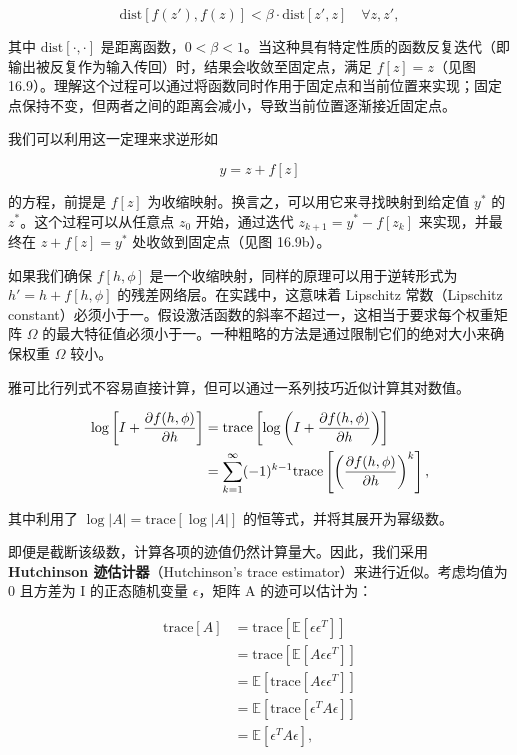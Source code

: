 \begin{equation}
\text{dist} [f(z'), f(z)] < \beta \cdot \text{dist} [z', z] \quad \forall z, z', 
\end{equation}

其中 \(\text{dist}[\cdot,\cdot]\) 是距离函数，\(0 < \beta < 1\)。当这种具有特定性质的函数反复迭代（即输出被反复作为输入传回）时，结果会收敛至固定点，满足 \(f[z] = z\)（见图 16.9）。理解这个过程可以通过将函数同时作用于固定点和当前位置来实现；固定点保持不变，但两者之间的距离会减小，导致当前位置逐渐接近固定点。

我们可以利用这一定理来求逆形如

\begin{equation}
y = z + f[z] 
\end{equation}

的方程，前提是 \(f[z]\) 为收缩映射。换言之，可以用它来寻找映射到给定值 \(y^*\) 的 \(z^*\)。这个过程可以从任意点 \(z_0\) 开始，通过迭代 \(z_{k+1} = y^* - f[z_k]\) 来实现，并最终在 \(z + f[z] = y^*\) 处收敛到固定点（见图 16.9b）。

如果我们确保 \(f[h, \phi]\) 是一个收缩映射，同样的原理可以用于逆转形式为 \(h' = h + f[h, \phi]\) 的残差网络层。在实践中，这意味着 Lipschitz 常数（Lipschitz constant）必须小于一。假设激活函数的斜率不超过一，这相当于要求每个权重矩阵 \(\Omega\) 的最大特征值必须小于一。一种粗略的方法是通过限制它们的绝对大小来确保权重 \(\Omega\) 较小。

雅可比行列式不容易直接计算，但可以通过一系列技巧近似计算其对数值。

\begin{align}
\log \left[ I + \frac{\partial f(h, \phi)}{\partial h} \right] &= \text{trace} \left[ \log \left( I + \frac{\partial f(h, \phi)}{\partial h} \right) \right] \notag \\
&= \sum_{k=1}^{\infty} (-1)^{k-1} \text{trace} \left[ \left( \frac{\partial f(h, \phi)}{\partial h} \right)^k \right], 
\end{align} 



其中利用了 \(\log|A| = \text{trace}[\log|A|]\) 的恒等式，并将其展开为幂级数。

即便是截断该级数，计算各项的迹值仍然计算量大。因此，我们采用 \textbf{Hutchinson 迹估计器}（Hutchinson's trace estimator）来进行近似。考虑均值为 0 且方差为 I 的正态随机变量 \(\epsilon\)，矩阵 A 的迹可以估计为：

\begin{equation}
\begin{aligned}
\text{trace}[A] &= \text{trace} [\mathbb{E} [\epsilon \epsilon^T]]  \\
&= \text{trace} [\mathbb{E} [A \epsilon \epsilon^T]]  \\
&= \mathbb{E} [\text{trace} [A \epsilon \epsilon^T]]  \\
&= \mathbb{E} [\text{trace} [\epsilon^T A \epsilon]] \\
&= \mathbb{E} [\epsilon^T A \epsilon], \\
\end{aligned} 
\end{equation}

